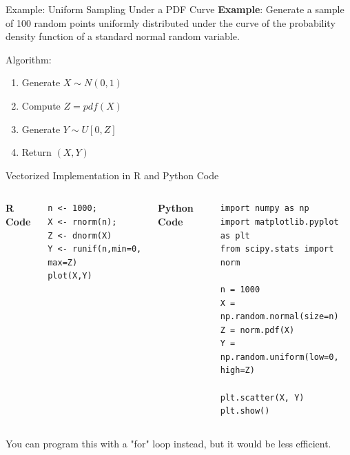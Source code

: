 \documentclass[8pt]{beamer}
\begin{document}
\begin{frame}{Example: Uniform Sampling Under a PDF Curve}
\textbf{Example}: Generate a sample of 100 random points uniformly distributed under the curve of the probability density function of a standard normal random variable.

\vspace{2mm}

\alert{Algorithm}:

\begin{enumerate}
\item Generate $X \sim N(0,1)$
\item Compute $Z=pdf(X)$
\item Generate $Y \sim U[0, Z]$
\item Return $(X,Y)$
\end{enumerate}
\end{frame}

\begin{frame}[fragile]{Vectorized Implementation in R and Python}
\alert{Code}

\begin{columns}
\textbf{R Code}

\begin{lstlisting}
n <- 1000;
X <- rnorm(n);
Z <- dnorm(X)
Y <- runif(n,min=0, max=Z)
plot(X,Y)
\end{lstlisting}

\textbf{Python Code}

\begin{lstlisting}
import numpy as np
import matplotlib.pyplot as plt
from scipy.stats import norm

n = 1000
X = np.random.normal(size=n)
Z = norm.pdf(X)
Y = np.random.uniform(low=0, high=Z)

plt.scatter(X, Y)
plt.show()
\end{lstlisting}
\end{columns}

\vspace{2mm}

You can program this with a "for" loop instead, but it would be less efficient.
\end{frame}
\end{document}
